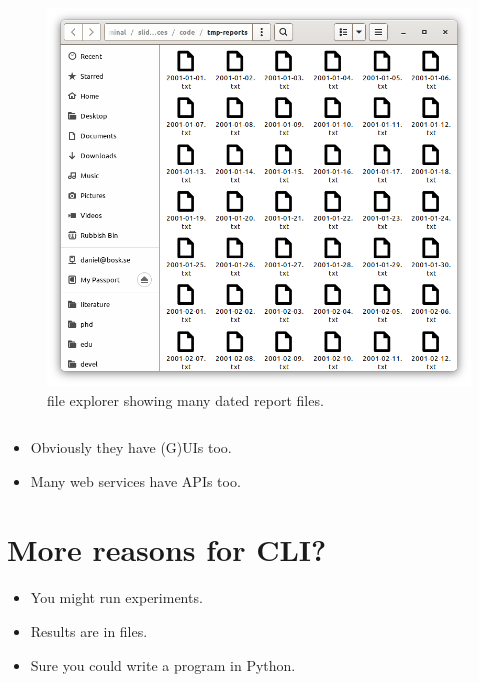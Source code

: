 \begin{frame}[fragile]
  \begin{figure}
    \includegraphics[height=0.5\textheight]{fig/many-reports.png}
    \caption{file explorer showing many dated report files.}
  \end{figure}

  \begin{solution}
    \inputminted[firstline=3]{bash}{code/summer.sh}
  \end{solution}
\end{frame}

\begin{frame}
  \begin{remark}
    \begin{itemize}
      \item Obviously they have (G)UIs too.
      \item Many web services have APIs too.
    \end{itemize}
  \end{remark}
\end{frame}


\section{More reasons for CLI?}

\begin{frame}
  \begin{example}
    \begin{itemize}
      \item You might run experiments.
      \item Results are in files.
      \item Sure you could write a program in Python.
    \end{itemize}
  \end{example}
\end{frame}

